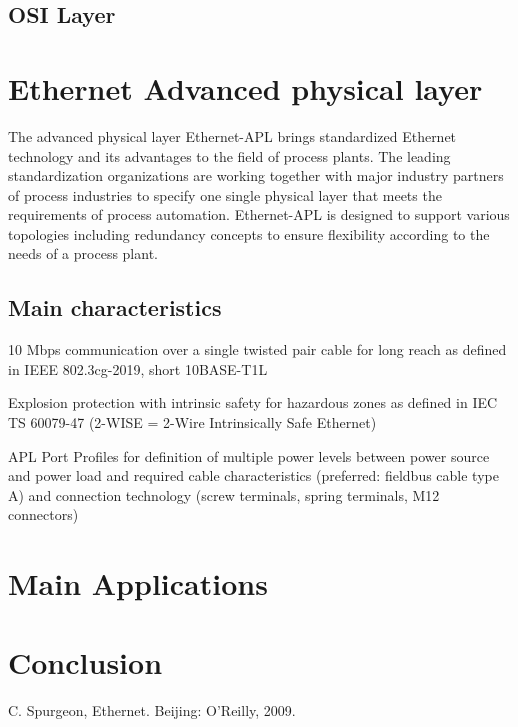 \documentclass[conference]{IEEEtran}
\begin{document}
\subsection{OSI Layer}


\section{Ethernet Advanced physical layer}
The advanced physical layer Ethernet-APL brings standardized Ethernet technology and its advantages to the field of process plants. The leading standardization organizations are working together with major industry partners of process industries to specify one single physical layer that meets the requirements of process automation. Ethernet-APL is designed to support various topologies including redundancy concepts to ensure flexibility according to the needs of a process plant.
\subsection{Main characteristics}
10 Mbps communication over a single twisted pair cable for long reach as defined in IEEE 802.3cg-2019, short 10BASE-T1L

Explosion protection with intrinsic safety for hazardous zones as defined in IEC TS 60079-47 (2-WISE = 2-Wire Intrinsically Safe Ethernet)

APL Port Profiles for definition of multiple power levels between power source and power load and required cable characteristics (preferred: fieldbus cable type A) and connection technology (screw terminals, spring terminals, M12 connectors)
\section{Main Applications}

\section{Conclusion}




\begin{thebibliography}{00}
 C. Spurgeon, Ethernet. Beijing: O'Reilly, 2009.
\end{thebibliography}
\end{document}
